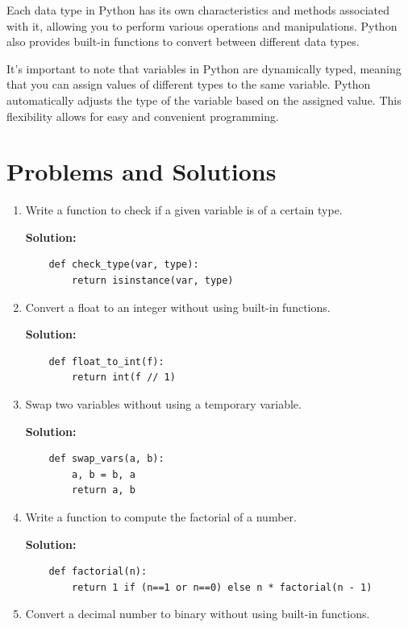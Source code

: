 \documentclass[12pt]{book}
\begin{document}
Each data type in Python has its own characteristics and methods associated with it, allowing you to perform various operations and manipulations. Python also provides built-in functions to convert between different data types.

It's important to note that variables in Python are dynamically typed, meaning that you can assign values of different types to the same variable. Python automatically adjusts the type of the variable based on the assigned value. This flexibility allows for easy and convenient programming.


\section{Problems and Solutions}
\begin{enumerate}
    \item  Write a function to check if a given variable is of a certain type.

    \textbf{Solution:}
    \begin{lstlisting}
    def check_type(var, type):
        return isinstance(var, type)
    \end{lstlisting}
    
    \item  Convert a float to an integer without using built-in functions.

    \textbf{Solution:}
    \begin{lstlisting}
    def float_to_int(f):
        return int(f // 1)
    \end{lstlisting}

    \item  Swap two variables without using a temporary variable.

    \textbf{Solution:}
    \begin{lstlisting}
    def swap_vars(a, b):
        a, b = b, a
        return a, b
    \end{lstlisting}

    \item  Write a function to compute the factorial of a number.

    \textbf{Solution:}
    \begin{lstlisting}
    def factorial(n):
        return 1 if (n==1 or n==0) else n * factorial(n - 1)
    \end{lstlisting}

    \item  Convert a decimal number to binary without using built-in functions.


\end{enumerate}
\end{document}
